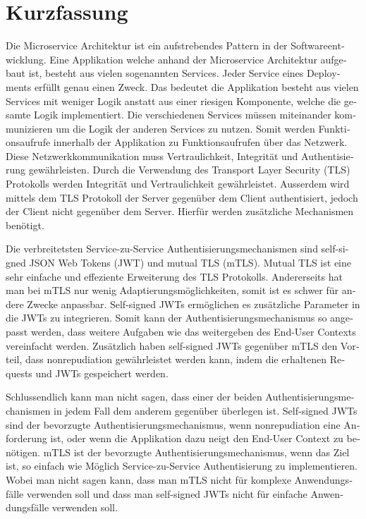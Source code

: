 \chapter{Kurzfassung}

\begin{german}
	Die Microservice Architektur ist ein aufstrebendes Pattern in der Softwareentwicklung.
	Eine Applikation welche anhand der Microservice Architektur aufgebaut ist, besteht aus vielen sogenannten Services.
	Jeder Service eines Deployments erfüllt genau einen Zweck.
	Das bedeutet die Applikation besteht aus vielen Services mit weniger Logik anstatt aus einer riesigen Komponente, welche die gesamte Logik implementiert.
	Die verschiedenen Services müssen miteinander kommunizieren um die Logik der anderen Services zu nutzen.
	Somit werden Funktionsaufrufe innerhalb der Applikation zu Funktionsaufrufen über das Netzwerk.
	Diese Netzwerkkommunikation muss Vertraulichkeit, Integrität und Authentisierung gewährleisten.
	Durch die Verwendung des Transport Layer Security (TLS) Protokolls werden Integrität und Vertraulichkeit gewährleistet.
	Ausserdem wird mittels dem TLS Protokoll der Server gegenüber dem Client authentisiert, jedoch der Client nicht gegenüber dem Server.
	Hierfür werden zusätzliche Mechanismen benötigt.

	Die verbreitetsten Service-zu-Service Authentisierungsmechanismen sind self-signed JSON Web Tokens (JWT) und mutual TLS (mTLS).
	Mutual TLS ist eine sehr einfache und effeziente Erweiterung des TLS Protokolls.
	Andererseits hat man bei mTLS nur wenig Adaptierungsmöglichkeiten, somit ist es schwer für andere Zwecke anpassbar.
	Self-signed JWTs ermöglichen es zusätzliche Parameter in die JWTs zu integrieren.
	Somit kann der Authentisierungsmechanismus so angepasst werden, dass weitere Aufgaben wie das weitergeben des End-User Contexts vereinfacht werden.
	Zusätzlich haben self-signed JWTs gegenüber mTLS den Vorteil, dass nonrepudiation gewährleistet werden kann, indem die erhaltenen Requests und JWTs gespeichert werden.

	Schlussendlich kann man nicht sagen, dass einer der beiden Authentisierungsmechanismen in jedem Fall dem anderem gegenüber überlegen ist.
	Self-signed JWTs sind der bevorzugte Authentisierungsmechanismus, wenn nonrepudiation eine Anforderung ist, oder wenn die Applikation dazu neigt den End-User Context zu benötigen.
	mTLS ist der bevorzugte Authentisierungsmechanismus, wenn das Ziel ist, so einfach wie Möglich Service-zu-Service Authentisierung zu implementieren.
	Wobei man nicht sagen kann, dass man mTLS nicht für komplexe Anwendungsfälle verwenden soll und dass man self-signed JWTs nicht für einfache Anwendungsfälle verwenden soll.
\end{german}
